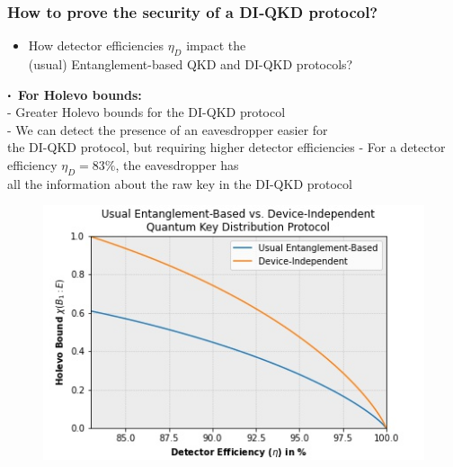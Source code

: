 \documentclass{beamer}
\newcommand\sbullet[1][.5]{\mathbin{\vcenter{\hbox{\scalebox{#1}{$\bullet$}}}}}
\begin{document}
		\begin{frame}
			\frametitle{\large How to prove the security of a DI‑QKD protocol?}

            \vspace{4ex}
            \begin{itemize}
                \item How detector efficiencies ${\eta}_{D}$ impact the\\ (usual) Entanglement-based QKD and DI-QKD protocols?
            \end{itemize}
            
            \begin{minipage}{0.5\textwidth}
                \centering
                \vspace{0.5ex}
                \scriptsize
                $\sbullet$\, \textbf{For Holevo bounds:}\\
                \vspace{0.25ex}
                \tiny
                - Greater Holevo bounds for the DI-QKD protocol\\
                - We can detect the presence of an eavesdropper easier for\\ the DI-QKD protocol, but requiring higher detector efficiencies
                - For a detector efficiency ${\eta}_{D} = 83\%$, the eavesdropper has\\ all the information about the raw key in the DI-QKD protocol
                \vspace{-1.2ex}
                \begin{figure}
                    \includegraphics[width=\linewidth]{figures/presentation/jpg/holevo-bounds-detector-efficiency-plot.jpg}

\end{figure}
\end{minipage}
\end{frame}
\end{document}

